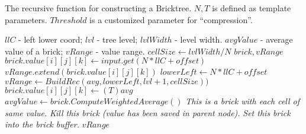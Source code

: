 \vspace{-1em}
\begin{algorithm}
	\caption{The recursive function for constructing a Bricktree. $N,T$ is defined as template parameters. $Threshold$ is a customized parameter for ``compression''.}\label{alg:bricktree}
	\begin{algorithmic}[1]
	    \Require $llC$ - left lower coord; $lvl$ - tree level; $lvlWidth$ - level width.
        \Ensure $avgValue$ - average value of a brick; $vRange$ - value range.
			\State $cellSize \gets lvlWidth / N $
			\State $brick, vRange$
				\State $brick.value[i][j][k] \gets input.get(N * llC + offset)$
				\State $vRange.extend(brick.value[i][j][k])$
			\Else
			    \State $lowerLeft \gets N*llC + offset$
				\State $vRange \gets BuildRec(avg,lowerLeft, lvl+1,cellSize))$
				\State $brick.value[i][j][k] \gets (T)avg$
			\EndIf
			\State $avgValue \gets brick.ComputeWeightedAverage()$
				\State \textit{This is a brick with each cell of same value.}
				\State \textit{Kill this brick (value has been saved in parent node).}
			\Else
				\State \textit{Set this brick into the brick buffer.}
			\EndIf
			\Return $vRange$
    	\EndFunction
	\end{algorithmic}
\end{algorithm}





